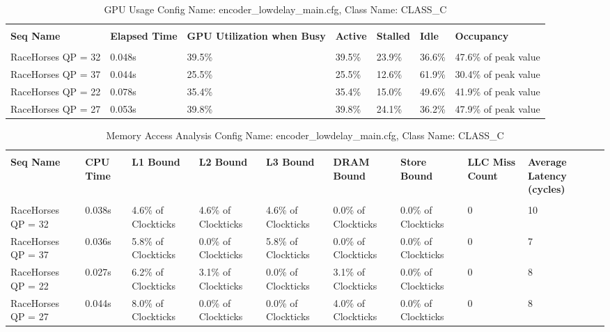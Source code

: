 \documentclass{article}%
\begin{document}
\newpage%
\begin{longtabu}{| X[l] | X[l] | X[l] | X[l] | X[l] | X[l] | X[l] |}%
\caption{%
GPU Usage\newline%
 Config Name: encoder\_lowdelay\_main.cfg,\newline%
 Class Name: CLASS\_C\newline%
%
}%
\hline%
&&&&&&\\%
\textbf{Seq Name}&\textbf{Elapsed Time}&\textbf{GPU Utilization when Busy}&\textbf{Active}&\textbf{Stalled}&\textbf{Idle}&\textbf{Occupancy}\\%
&&&&&&\\%
\hline%
\endhead%
RaceHorses\newline%
 QP = 32&0.048s&39.5\%&39.5\%&23.9\%&36.6\%&47.6\% of peak value\\%
\hline%
RaceHorses\newline%
 QP = 37&0.044s&25.5\%&25.5\%&12.6\%&61.9\%&30.4\% of peak value\\%
\hline%
RaceHorses\newline%
 QP = 22&0.078s&35.4\%&35.4\%&15.0\%&49.6\%&41.9\% of peak value\\%
\hline%
RaceHorses\newline%
 QP = 27&0.053s&39.8\%&39.8\%&24.1\%&36.2\%&47.9\% of peak value\\%
\hline%
\end{longtabu}%
\begin{longtabu}{| X[l] | X[l] | X[l] | X[l] | X[l] | X[l] | X[l] | X[l] | X[l] |}%
\caption{%
Memory Access Analysis\newline%
 Config Name: encoder\_lowdelay\_main.cfg,\newline%
 Class Name: CLASS\_C\newline%
%
}%
\hline%
&&&&&&&&\\%
\textbf{Seq Name}&\textbf{CPU Time}&\textbf{L1 Bound}&\textbf{L2 Bound}&\textbf{L3 Bound}&\textbf{DRAM Bound}&\textbf{Store Bound}&\textbf{LLC Miss Count}&\textbf{Average Latency (cycles)}\\%
&&&&&&&&\\%
\hline%
\endhead%
RaceHorses\newline%
 QP = 32&0.038s&4.6\% of Clockticks&4.6\% of Clockticks&4.6\% of Clockticks&0.0\% of Clockticks&0.0\% of Clockticks&0&10\\%
\hline%
RaceHorses\newline%
 QP = 37&0.036s&5.8\% of Clockticks&0.0\% of Clockticks&5.8\% of Clockticks&0.0\% of Clockticks&0.0\% of Clockticks&0&7\\%
\hline%
RaceHorses\newline%
 QP = 22&0.027s&6.2\% of Clockticks&3.1\% of Clockticks&0.0\% of Clockticks&3.1\% of Clockticks&0.0\% of Clockticks&0&8\\%
\hline%
RaceHorses\newline%
 QP = 27&0.044s&8.0\% of Clockticks&0.0\% of Clockticks&0.0\% of Clockticks&4.0\% of Clockticks&0.0\% of Clockticks&0&8\\%
\hline%
\end{longtabu}%
\end{document}
